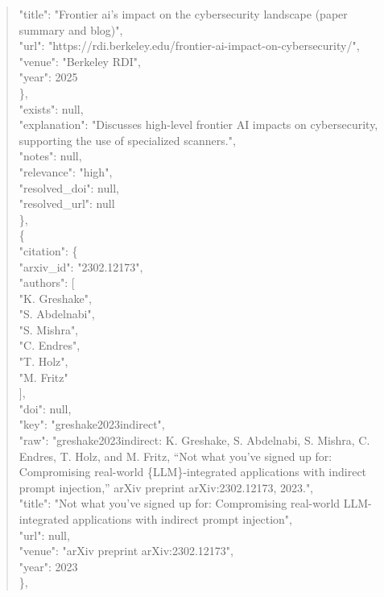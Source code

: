 \documentclass[11pt]{article}
\begin{document}
\begin{quote}
        "title": "Frontier ai's impact on the cybersecurity landscape (paper summary and blog)",\\
        "url": "https://rdi.berkeley.edu/frontier-ai-impact-on-cybersecurity/",\\
        "venue": "Berkeley RDI",\\
        "year": 2025\\
      \},\\
      "exists": null,\\
      "explanation": "Discusses high-level frontier AI impacts on cybersecurity, supporting the use of specialized scanners.",\\
      "notes": null,\\
      "relevance": "high",\\
      "resolved\_doi": null,\\
      "resolved\_url": null\\
    \},\\
    \{\\
      "citation": \{\\
        "arxiv\_id": "2302.12173",\\
        "authors": [\\
          "K. Greshake",\\
          "S. Abdelnabi",\\
          "S. Mishra",\\
          "C. Endres",\\
          "T. Holz",\\
          "M. Fritz"\\
        ],\\
        "doi": null,\\
        "key": "greshake2023indirect",\\
        "raw": "greshake2023indirect: K. Greshake, S. Abdelnabi, S. Mishra, C. Endres, T. Holz, and M. Fritz, ``Not what you've signed up for: Compromising real-world \{LLM\}-integrated applications with indirect prompt injection,'' arXiv preprint arXiv:2302.12173, 2023.",\\
        "title": "Not what you've signed up for: Compromising real-world LLM-integrated applications with indirect prompt injection",\\
        "url": null,\\
        "venue": "arXiv preprint arXiv:2302.12173",\\
        "year": 2023\\
      \},\\

\end{quote}
\end{document}
